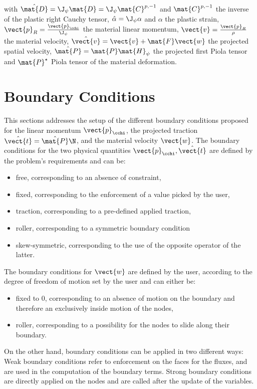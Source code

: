 with $\hat{\mat{D}} = \J_{\psi}\mat{D} = \J_{\psi} \mat{C}^{p,-1}$ and $\mat{C}^{p,-1}$ the inverse of the plastic right Cauchy tensor, $\hat{\alpha} = \J_{\psi}\alpha$ and $\alpha$ the plastic strain, $\vect{p}_R = \frac{\vect{p}_{\cchi}}{\J_{\psi}}$ the material linear momentum, $\vect{v} = \frac{\vect{p}_R}{\rho}$ the material velocity, $\hat{\vect{v}} = \vect{v} + \mat{F}\vect{w}$ the projected spatial velocity, $\hat{\mat{P}} = \mat{P}\mat{H}_{\psi}$ the projected first Piola tensor and $\mat{P}^\star$ Piola tensor of the material deformation. 

\newpage
\section{Boundary Conditions}
This sections addresses the setup of the different boundary conditions proposed for the linear momentum $\vect{p}_{\cchi}$, the projected traction $\hat{\vect{t}} = \hat{\mat{P}}\N$, and the material velocity $\vect{w}$.
%
The boundary conditions for the two physical quantities $\vect{p}_{\cchi}, \hat{\vect{t}}$ are defined by the problem's requirements and can be:
\begin{itemize}
	\setlength\itemsep{\lineskip}
	\item free, corresponding to an absence of constraint,
	\item fixed, corresponding to the enforcement of a value picked by the user,
	\item traction, corresponding to a pre-defined applied traction,
	\item roller, corresponding to a symmetric boundary condition
	\item skew-symmetric, corresponding to the use of the opposite operator of the latter.
\end{itemize}
The boundary conditions for $\vect{w}$ are defined by the user, according to the degree of freedom of motion set by the user and can either be:
\begin{itemize}
	\setlength\itemsep{\lineskip}
	\item fixed to 0, corresponding to an absence of motion on the boundary and therefore an exclusively inside motion of the nodes,
	\item roller, corresponding to a possibility for the nodes to slide along their boundary.
\end{itemize}

On the other hand, boundary conditions can be applied in two different ways: Weak boundary conditions refer to enforcement on the faces for the fluxes, and are used in the computation of the boundary terms. Strong boundary conditions are directly applied on the nodes and are called after the update of the variables.

